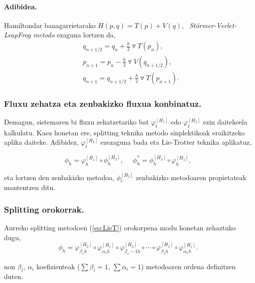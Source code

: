 \begin{enumerate}
\paragraph*{Adibidea.}

Hamiltondar banagarrietarako $H(p,q)=T(p)+V(q)$, ~\emph{Störmer-Verlet-LeapFrog metodo} ezaguna lortzen da,
\begin{align*}
&q_{{n+1}/{2}} =q_n+\frac{h}{2} \triangledown T(p_n), \\
&p_{n+1} =p_n-\frac{h}{2} \triangledown V(q_{{n+1}/{2}}), \\
&q_{n+1} =q_{{n+1}/{2}}+\frac{h}{2} \triangledown T(p_{n+1}).
\end{align*}

\end{enumerate}

\subsubsection*{Fluxu zehatza eta zenbakizko fluxua konbinatuz.}
Demagun, sistemaren bi fluxu zehatzetariko bat $\varphi_t^{[H_1]}$ edo $\varphi_t^{[H_2]}$ ezin daitekeela kalkulatu. Kasu honetan ere, splitting teknika  metodo sinplektikoak eraikitzeko aplika daiteke. Adibidez, $\varphi_t^{[H_2]}$ ezezaguna bada eta Lie-Trotter teknika aplikatuz,

\begin{equation*}
\phi_h=\varphi_h^{[H_1]} \circ \phi_h^{[H_2]}, \ \ \ \ \ \  \phi_h^{*}=\phi_h^{[H_2]} \circ \varphi_h^{[H_1]},
\end{equation*}

eta lortzen den zenbakizko metodoa, $\phi_t^{[H_2]}$ zenbakizko metodoaren propietateak mantentzen ditu. 

\subsubsection*{Splitting orokorrak.}

Aurreko splitting metodoen (\ref{eq:LieT}) orokorpena modu honetan zehaztuko dugu,
\begin{equation}
\phi_h = \varphi_{\beta_s h}^{[H_2]} \circ \varphi_{\alpha_s h}^{[H_1]} \circ \varphi_{\beta_s-1 h}^{[H_2]} 
\circ \cdots \circ \varphi_{\beta_1 h}^{[H_2]} \circ \varphi_{\alpha_1 h}^{[H_1]} .
\end{equation}

non $\beta_i$, $\alpha_i$ koefizienteak ($\sum \beta_i=1$, $\sum \alpha_i=1$) metodoaren ordena definitzen duten.


